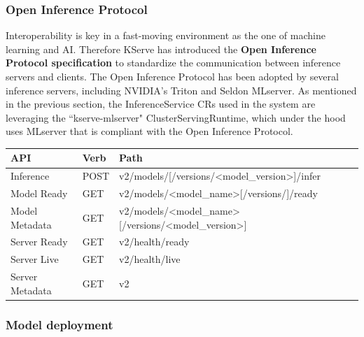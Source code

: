 \subsubsection{Open Inference Protocol}

Interoperability is key in a fast-moving environment as the one of machine learning and AI. 
Therefore KServe has introduced the \textbf{Open Inference Protocol specification} to standardize the communication between inference servers and clients. 
The Open Inference Protocol has been adopted by several inference servers, including NVIDIA's Triton and Seldon MLserver.
As mentioned in the previous section, the InferenceService CRs used in the system are leveraging the ``kserve-mlserver" ClusterServingRuntime, which under the hood uses MLserver that is compliant with the Open Inference Protocol.


\begin{table}[h!]
\centering
\begin{tabular}{|l|l|l|}
\hline
\textbf{API}    & \textbf{Verb} & \textbf{Path}                                                                                         \\ \hline
Inference       & POST          & v2/models/{[}/versions/\textless{}model\_version\textgreater{}{]}/infer                               \\ \hline
Model Ready     & GET           & v2/models/\textless{}model\_name\textgreater{}{[}/versions/{]}/ready                                  \\ \hline
Model Metadata  & GET           & v2/models/\textless{}model\_name\textgreater{}{[}/versions/\textless{}model\_version\textgreater{}{]} \\ \hline
Server Ready    & GET           & v2/health/ready                                                                                       \\ \hline
Server Live     & GET           & v2/health/live                                                                                        \\ \hline
Server Metadata & GET           & v2                                                                                                    \\ \hline
\end{tabular}
\end{table}

\subsubsection{Model deployment}

